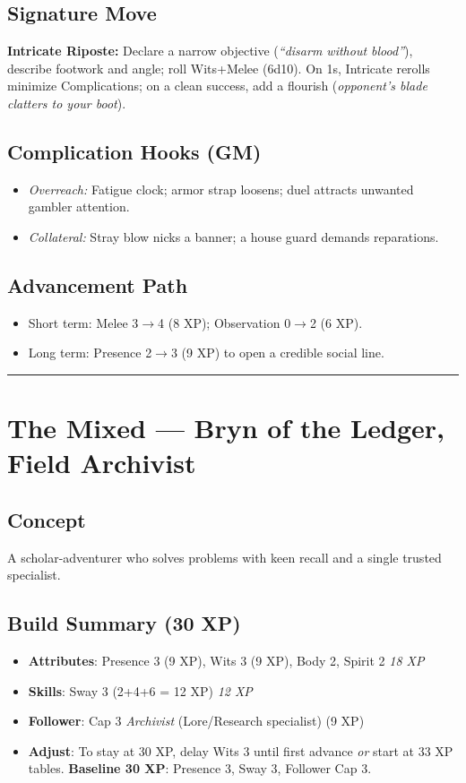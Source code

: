 \documentclass[12pt]{article}
\begin{document}
\subsection*{Signature Move}
\textbf{Intricate Riposte:} Declare a narrow objective (\emph{``disarm without blood''}), describe footwork and angle; roll Wits+Melee (6d10). On 1s, Intricate rerolls minimize Complications; on a clean success, add a flourish (\emph{opponent’s blade clatters to your boot}).

\subsection*{Complication Hooks (GM)}
\begin{itemize}
  \item \emph{Overreach:} Fatigue clock; armor strap loosens; duel attracts unwanted gambler attention.
  \item \emph{Collateral:} Stray blow nicks a banner; a house guard demands reparations.
\end{itemize}

\subsection*{Advancement Path}
\begin{itemize}
  \item Short term: Melee 3$\rightarrow$4 (8 XP); Observation 0$\rightarrow$2 (6 XP).
  \item Long term: Presence 2$\rightarrow$3 (9 XP) to open a credible social line.
\end{itemize}

\bigskip
\hrule
\bigskip

\section{The Mixed — Bryn of the Ledger, Field Archivist}

\subsection*{Concept}
A scholar-adventurer who solves problems with keen recall and a single trusted specialist.

\subsection*{Build Summary (30 XP)}
\begin{itemize}
  \item \textbf{Attributes}: Presence 3 (9 XP), Wits 3 (9 XP), Body 2, Spirit 2 \hfill \emph{18 XP}
  \item \textbf{Skills}: Sway 3 (2+4+6 = 12 XP) \hfill \emph{12 XP}
  \item \textbf{Follower}: Cap 3 \emph{Archivist} (Lore/Research specialist) (9 XP)
  \item \textbf{Adjust}: To stay at 30 XP, delay Wits 3 until first advance \emph{or} start at 33 XP tables. \textbf{Baseline 30 XP}: Presence 3, Sway 3, Follower Cap 3.
\end{itemize}
\end{document}
